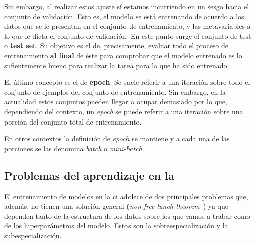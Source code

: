 Sin embargo, al realizar estos ajuste sí estamos incurriendo en un sesgo hacia el conjunto de validación. Esto es, el modelo se está entrenando de acuerdo a los datos que se le presentan en el conjunto de entrenamiento, y las metavariables a lo que le dicta el conjunto de validación. En este punto surge el conjunto de test o \textbf{test set}. Su objetivo es el de, precisamente, evaluar todo el proceso de entrenamiento \textbf{al final} de éste para comprobar que el modelo entrenado es lo sufientemente bueno para realizar la tarea para la que ha sido entrenado.

El último concepto es el de \textbf{epoch}. Se suele referir a una iteración sobre todo el conjunto de ejemplos del conjunto de entrenamiento. Sin embargo, en la actualidad estos conjuntos pueden llegar a ocupar demasiado por lo que, dependiendo del contexto, un \textit{epoch} se puede referir a una iteración sobre una porción del conjunto total de entrenamiento.

En otros contextos la definición de \textit{epoch} se mantiene y a cada una de las porciones se las denomina \textit{batch} o \textit{mini-batch}.

\subsection{Problemas del aprendizaje en la }

El entrenamiento de modelos en la \gls{ci} adolece de dos principales problemas que, además, no tienen una solución general (\textit{non free-lunch theorem}~\cite{wolpert1997no}) ya que dependen tanto de la estructura de los datos sobre los que vamos a trabar como de los hiperparámetros del modelo. Estos son la sobreespecialización y la subespecialización.

